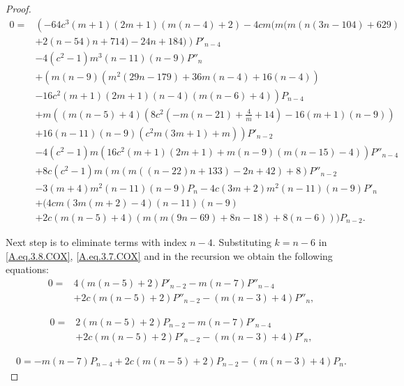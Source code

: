 \documentclass[review,nopreprintline]{elsarticle}
\theoremstyle{definition}
\numberwithin{equation}{section}
\theoremstyle{remark}
\begin{document}
\begin{proof}
	        \begin{align*}
	            0=&\left(-64 c^3 (m+1) (2 m+1) (m (n-4)+2)-4 c m (m (m (n (3 n-104)+629)\right.\\
	            &\left.+2 (n-54) n+714)-24 n+184)\right) P'_{n-4} \\
	            &-4 \left(c^2-1\right) m^3 (n-11) (n-9) P''_n \\
	            &+\left(m (n-9) \left(m^2 (29 n-179)+36 m (n-4)+16 (n-4)\right)\right.\\
	            &\left.-16 c^2 (m+1) (2 m+1) (n-4) (m (n-6)+4)\right) P_{n-4} \\
	            &+m \left((m (n-5)+4) \left(8 c^2 \left(-m (n-21)+\frac{4}{m}+14\right)-16 (m+1) (n-9)\right)\right.\\
	            &\left.+16 (n-11) (n-9) \left(c^2 m (3 m+1)+m\right)\right) P'_{n-2} \\
	            &-4 \left(c^2-1\right) m \left(16 c^2 (m+1) (2 m+1)+m (n-9) (m (n-15)-4)\right) P''_{n-4} \\
	            &+8 c \left(c^2-1\right) m (m (m ((n-22) n+133)-2 n+42)+8) P''_{n-2} \\
	            &-3 (m+4) m^2 (n-11) (n-9) P_n -4 c (3 m+2) m^2 (n-11) (n-9)  P'_n \\
	            &+(4 c m (3 m (m+2)-4) (n-11) (n-9)\\
	            &+2 c (m (n-5)+4) (m (m (9 n-69)+8 n-18)+8 (n-6))) P_{n-2}.
	        \end{align*}
	     
	     Next step is to eliminate terms with index $n-4$. Substituting $k=n-6$ in \eqref{A.eq.3.8.COX}, \eqref{A.eq.3.7.COX} and in the recursion we obtain the following equations:
	        \begin{align*}
	            0=&4 (m (n-5)+2) P'_{n-2} -m (n-7) P''_{n-4} \\
	            &+2 c (m (n-5)+2) P''_{n-2} -(m (n-3)+4) P''_n,
	        \end{align*}
	      
	        \begin{align*}
	            0=&2 (m (n-5)+2) P_{n-2} -m (n-7) P'_{n-4} \\&+2 c (m (n-5)+2) P'_{n-2} -(m (n-3)+4)  P'_n,
	        \end{align*}
	       
	        \begin{align*}
	            0=-m (n-7) P_{n-4} +2 c (m (n-5)+2) P_{n-2} -(m (n-3)+4) P_n.
	                    \end{align*}
	       

\end{proof}
\end{document}
